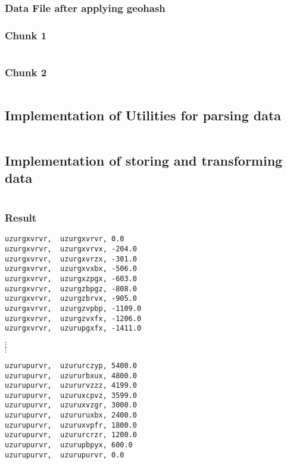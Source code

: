 \documentclass[paper=letter, fontsize=12pt]{article}
\begin{document}
\subsubsection{Data File after applying geohash}\label{geo-hashed}
\subsubsection{Chunk 1}\label{hash-chunk-1}
\inputminted[firstline=0,lastline=10]{text}{../file2.txt}
\subsubsection{Chunk 2}\label{hash-chunk-2}
\inputminted[firstline=2050,lastline=2060]{text}{../file2.txt}

\subsection{Implementation of Utilities for parsing data}\label{data-read}
\inputminted{python}{../simulator.py}

\subsection{Implementation of storing and transforming data}\label{data-transformation}
\inputminted{python}{../main.py}

\subsubsection{Result}\label{result}
\begin{verbatim}
uzurgxvrvr,  uzurgxvrvr, 0.0
uzurgxvrvr,  uzurgxvrvx, -204.0
uzurgxvrvr,  uzurgxvrzx, -301.0
uzurgxvrvr,  uzurgxvxbx, -506.0
uzurgxvrvr,  uzurgxzpgx, -603.0
uzurgxvrvr,  uzurgzbpgz, -808.0
uzurgxvrvr,  uzurgzbrvx, -905.0
uzurgxvrvr,  uzurgzvpbp, -1109.0
uzurgxvrvr,  uzurgzvxfx, -1206.0
uzurgxvrvr,  uzurupgxfx, -1411.0
\end{verbatim}
$ \vdots $
\\ $ \vdots $
\begin{verbatim}
uzurupurvr,  uzururczyp, 5400.0
uzurupurvr,  uzururbxux, 4800.0
uzurupurvr,  uzururvzzz, 4199.0
uzurupurvr,  uzuruxcpvz, 3599.0
uzurupurvr,  uzuruxvzgr, 3000.0
uzurupurvr,  uzururuxbx, 2400.0
uzurupurvr,  uzuruxvpfr, 1800.0
uzurupurvr,  uzururcrzr, 1200.0
uzurupurvr,  uzurupbpyx, 600.0
uzurupurvr,  uzurupurvr, 0.0
\end{verbatim}
\end{document}
